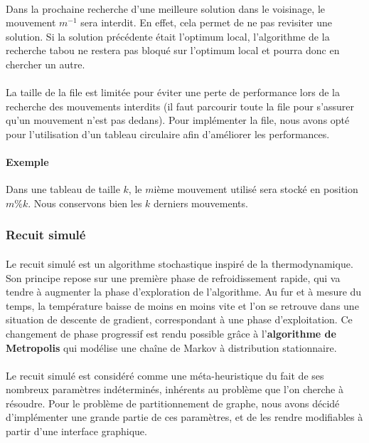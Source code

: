\documentclass[12pt]{article}
\begin{document}
\paragraph{}Dans la prochaine recherche d'une meilleure solution dans le voisinage, le mouvement $m^{-1}$ sera interdit.
En effet, cela permet de ne pas revisiter une solution.
Si la solution précédente était l'optimum local, l'algorithme de la recherche tabou ne restera pas bloqué sur l'optimum local et pourra donc en chercher un autre.

\paragraph{}La taille de la file est limitée pour éviter une perte de performance lors de la recherche des mouvements interdits (il faut parcourir toute la file pour s'assurer qu'un mouvement n'est pas dedans). Pour implémenter la file, nous avons opté pour l'utilisation d'un tableau circulaire afin d'améliorer les performances.

\paragraph{Exemple} Dans une tableau de taille $k$, le $m$ième mouvement utilisé sera stocké en position $m\%k$. Nous conservons bien les $k$ derniers mouvements.

\subsubsection{Recuit simulé}

\paragraph{}Le recuit simulé est un algorithme stochastique inspiré de la thermodynamique. Son principe repose sur une première phase de refroidissement rapide, qui va tendre à augmenter la phase d'exploration de l'algorithme. Au fur et à mesure du temps, la température baisse de moins en moins vite et l'on se retrouve dans une situation de descente de gradient, correspondant à une phase d'exploitation. Ce changement de phase progressif est rendu possible grâce à l'\textbf{algorithme de Metropolis} qui modélise une chaîne de Markov à distribution stationnaire.

\paragraph{}Le recuit simulé est considéré comme une méta-heuristique du fait de ses nombreux paramètres indéterminés, inhérents au problème que l'on cherche à résoudre. Pour le problème de partitionnement de graphe, nous avons décidé d'implémenter une grande partie de ces paramètres, et de les rendre modifiables à partir d'une interface graphique.
\end{document}
